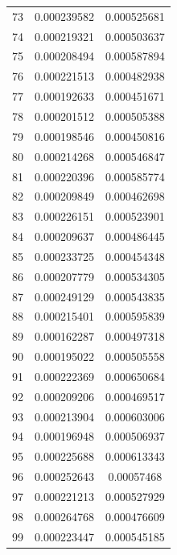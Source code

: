\documentclass{jreport}		%
\begin{document}
\begin{table}
\begin{tabular}{c|cc}
73&0.000239582&0.000525681 \\
74&0.000219321&0.000503637 \\
75&0.000208494&0.000587894 \\
76&0.000221513&0.000482938 \\
77&0.000192633&0.000451671 \\
78&0.000201512&0.000505388 \\
79&0.000198546&0.000450816 \\
80&0.000214268&0.000546847 \\
81&0.000220396&0.000585774 \\
82&0.000209849&0.000462698 \\
83&0.000226151&0.000523901 \\
84&0.000209637&0.000486445 \\
85&0.000233725&0.000454348 \\
86&0.000207779&0.000534305 \\
87&0.000249129&0.000543835 \\
88&0.000215401&0.000595839 \\
89&0.000162287&0.000497318 \\
90&0.000195022&0.000505558 \\
91&0.000222369&0.000650684 \\
92&0.000209206&0.000469517 \\
93&0.000213904&0.000603006 \\
94&0.000196948&0.000506937 \\
95&0.000225688&0.000613343 \\
96&0.000252643&0.00057468 \\
97&0.000221213&0.000527929 \\
98&0.000264768&0.000476609 \\
99&0.000223447&0.000545185 \\ \hline
  \end{tabular}
\end{table}
\end{document}
